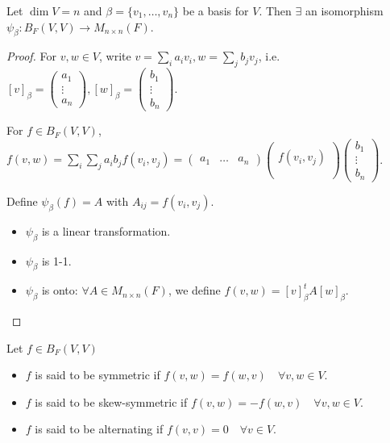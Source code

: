 \begin{theorem}
  Let $\dim V = n$ and $\beta = \{ v_1, \dots, v_n \}$ be a basis for $V$.
  Then $\exists$ an isomorphism $\psi_\beta: B_F(V, V) \to M_{n\times n}(F)$.
  \begin{proof}
    For $v, w \in V$, write $v = \sum_i a_iv_i, w = \sum_j b_j v_j$, i.e.
    $[v]_\beta = \begin{pmatrix}a_1\\ \vdots \\ a_n\end{pmatrix},
    [w]_\beta = \begin{pmatrix}b_1\\ \vdots \\ b_n\end{pmatrix}$.

    For $f \in B_F(V, V)$, $f(v, w) = \sum_i \sum_j a_ib_j f(v_i, v_j)
    = \begin{pmatrix}a_1 & \dots & a_n\end{pmatrix}
    \begin{pmatrix} \\ f(v_i, v_j) \\ \\ \end{pmatrix}
    \begin{pmatrix}b_1 \\ \vdots \\ b_n\end{pmatrix}$.

    Define $\psi_\beta(f) = A$ with $A_{ij} = f(v_i, v_j)$.
    \begin{itemize}
      \item $\psi_\beta$ is a linear transformation.
      \item $\psi_\beta$ is 1-1.
      \item $\psi_\beta$ is onto: $\forall A \in M_{n\times n}(F)$, we define
        $f(v, w) = [v]_\beta^t A [w]_\beta$.
        \qedhere
    \end{itemize}
  \end{proof}
\end{theorem}

\begin{definition}
  Let $f \in B_F(V, V)$
  \begin{itemize}
    \item $f$ is said to be symmetric if
      $f(v, w) = f(w, v) \quad \forall v, w \in V$.
    \item $f$ is said to be skew-symmetric if
      $f(v, w) = -f(w, v) \quad \forall v, w \in V$.
    \item $f$ is said to be alternating if $f(v, v) = 0 \quad \forall v \in V$.
  \end{itemize}
\end{definition}

